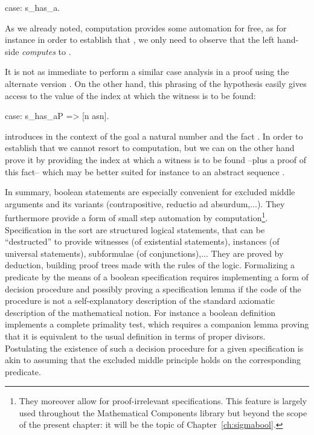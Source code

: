 \begin{coq}{}{}
case: s_has_a.
\end{coq}
As we already noted, computation provides some automation for free, as
for instance in order to establish that , we only need to observe that the left hand-side \emph{computes} to
.

It is not as immediate to perform a similar case analysis in a proof
using the alternate version . On the
other hand, this phrasing of the hypothesis easily gives access to the
value of the index at which the witness is to be found:

\begin{coq}{}{}
case: s_has_aP => [n asn].
\end{coq}
introduces in the context of the goal a natural number  and
the fact . In order to establish that
 we cannot resort to computation, but we can
on the other hand prove it by providing the index at which a witness is
to be found  --plus a proof of this fact-- which may be better suited
for instance to an abstract sequence .

In summary, boolean statements are especially convenient for excluded
middle arguments and its variants (contrapositive, reductio ad
absurdum,...). They furthermore provide a form of small step
automation by computation\footnote{They moreover allow for
  proof-irrelevant specifications. This feature is largely used
  throughout the Mathematical Components library but beyond the scope
  of the present chapter: it will be the topic of
  Chapter~\ref{ch:sigmabool}.}. Specification in the  sort
are structured logical statements, that can be ``destructed'' to
provide witnesses (of existential statements), instances (of universal
statements), subformulae (of conjunctions),... They are proved by
deduction, building proof trees made with the rules of the
logic. Formalizing a predicate by the means of a boolean specification
requires implementing a form of decision
procedure and possibly proving a specification lemma if
the code of the procedure is not a self-explanatory description of the
standard axiomatic description of the mathematical notion. For instance a
boolean definition  implements a complete
primality test, which requires a companion lemma proving that it is
equivalent to the usual definition in terms of proper
divisors. Postulating the existence of such a decision procedure for a
given specification is akin to assuming that the excluded middle
principle holds on the corresponding predicate.

